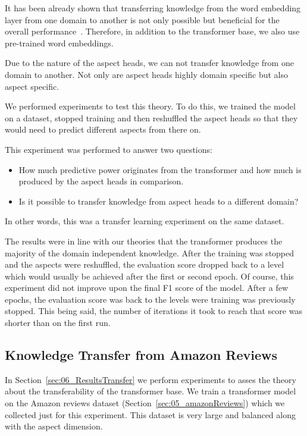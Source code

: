 It has been already shown that transferring knowledge from the word embedding layer from one domain to another is not only possible but beneficial for the overall performance~\cite{Yosinski2014}. Therefore, in addition to the transformer base, we also use pre-trained word embeddings.
\medskip

Due to the nature of the aspect heads, we can not transfer knowledge from one domain to another. Not only are aspect heads highly domain specific but also aspect specific. 
\smallskip

We performed experiments to test this theory. To do this, we trained the model on a dataset, stopped training and then reshuffled the aspect heads so that they would need to predict different aspects from there on. 

This experiment was performed to answer two questions: 

\begin{itemize}
    \item How much predictive power originates from the transformer and how much is produced by the aspect heads in comparison.
    \item Is it possible to transfer knowledge from aspect heads to a different domain?
\end{itemize}

In other words, this was a transfer learning experiment on the same dataset.

The results were in line with our theories that the transformer produces the majority of the domain independent knowledge. After the training was stopped and the aspects were reshuffled, the evaluation score dropped back to a level which would usually be achieved after the first or second epoch. Of course, this experiment did not improve upon the final F1 score of the model. After a few epochs, the evaluation score was back to the levels were training was previously stopped. This being said, the number of iterations it took to reach that score was shorter than on the first run.
\medskip

\subsection{Knowledge Transfer from Amazon Reviews}

In Section~\ref{sec:06_ResultsTransfer} we perform experiments to asses the theory about the transferability of the transformer base. We train a transformer model on the Amazon reviews dataset {(Section~\ref{sec:05_amazonReviews})} which we collected just for this experiment. This dataset is very large and balanced along with the aspect dimension.
\medskip

